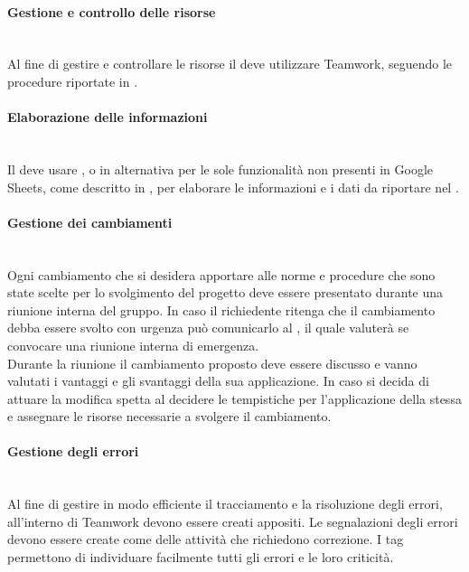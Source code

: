 \paragraph{Gestione e controllo delle risorse}\mbox{}\\
Al fine di gestire e controllare le risorse il \Responsabile{} deve utilizzare Teamwork, seguendo le procedure riportate in .

\paragraph{Elaborazione delle informazioni}\mbox{}\\
Il \Responsabile{} deve usare , o in alternativa  per le sole funzionalità non presenti in Google Sheets, come descritto in , per elaborare le informazioni e i dati da riportare nel \PianoDiProgetto.

\paragraph{Gestione dei cambiamenti}\mbox{}\\
Ogni cambiamento che si desidera apportare alle norme e procedure che sono state scelte per lo svolgimento del progetto deve essere presentato durante una riunione interna del gruppo. In caso il richiedente ritenga che il cambiamento debba essere svolto con urgenza può comunicarlo al \Responsabile{}, il quale valuterà se convocare una riunione interna di emergenza.
\\Durante la riunione il cambiamento proposto deve essere discusso e vanno valutati i vantaggi e gli svantaggi della sua applicazione. In caso si decida di attuare la modifica spetta al \Responsabile{} decidere le tempistiche per l'applicazione della stessa e assegnare le risorse necessarie a svolgere il cambiamento.

\paragraph{Gestione degli errori} \mbox{} \\
Al fine di gestire in modo efficiente il tracciamento e la risoluzione degli errori, all'interno di Teamwork devono essere creati  appositi.
Le segnalazioni degli errori devono essere create come  delle attività che richiedono correzione. I tag permettono di individuare facilmente tutti gli errori e le loro criticità.\\

